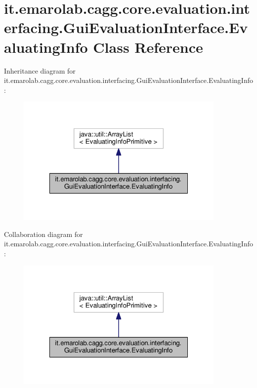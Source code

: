 \hypertarget{classit_1_1emarolab_1_1cagg_1_1core_1_1evaluation_1_1interfacing_1_1GuiEvaluationInterface_1_1EvaluatingInfo}{\section{it.\-emarolab.\-cagg.\-core.\-evaluation.\-interfacing.\-Gui\-Evaluation\-Interface.\-Evaluating\-Info Class Reference}
\label{classit_1_1emarolab_1_1cagg_1_1core_1_1evaluation_1_1interfacing_1_1GuiEvaluationInterface_1_1EvaluatingInfo}
}


Inheritance diagram for it.\-emarolab.\-cagg.\-core.\-evaluation.\-interfacing.\-Gui\-Evaluation\-Interface.\-Evaluating\-Info\-:\nopagebreak
\begin{figure}[H]
\begin{center}
\leavevmode
\includegraphics[width=288pt]{classit_1_1emarolab_1_1cagg_1_1core_1_1evaluation_1_1interfacing_1_1GuiEvaluationInterface_1_1EvaluatingInfo__inherit__graph}
\end{center}
\end{figure}


Collaboration diagram for it.\-emarolab.\-cagg.\-core.\-evaluation.\-interfacing.\-Gui\-Evaluation\-Interface.\-Evaluating\-Info\-:\nopagebreak
\begin{figure}[H]
\begin{center}
\leavevmode
\includegraphics[width=288pt]{classit_1_1emarolab_1_1cagg_1_1core_1_1evaluation_1_1interfacing_1_1GuiEvaluationInterface_1_1EvaluatingInfo__coll__graph}
\end{center}
\end{figure}
